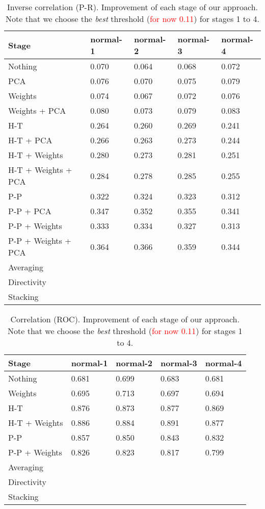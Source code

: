 \documentclass[wcp]{jmlr}
\begin{document}
\begin{table}[htb]
\centering
\caption{Inverse correlation (P-R). Improvement of each stage of our approach. Note that we choose the
         \textit{best} threshold (\textcolor{red}{for now 0.11}) for stages 1 to 4.}
\begin{tabular}{*{5}{l}}
\toprule
Stage               & normal-1 & normal-2 & normal-3 & normal-4 \\
\midrule
Nothing             & 0.070 & 0.064 & 0.068 & 0.072\\
PCA                 & 0.076 & 0.070 & 0.075 & 0.079\\
Weights             & 0.074 & 0.067 & 0.072 & 0.076\\
Weights + PCA       & 0.080 & 0.073 & 0.079 & 0.083\\
H-T                 & 0.264 & 0.260 & 0.269 & 0.241\\
H-T + PCA           & 0.266 & 0.263 & 0.273 & 0.244\\
H-T + Weights       & 0.280 & 0.273 & 0.281 & 0.251\\
H-T + Weights + PCA & 0.284 & 0.278 & 0.285 & 0.255\\
P-P                 & 0.322 & 0.324 & 0.323 & 0.312\\
P-P + PCA           & 0.347 & 0.352 & 0.355 & 0.341\\
P-P + Weights       & 0.333 & 0.334 & 0.327 & 0.313\\
P-P + Weights + PCA & 0.364 & 0.366 & 0.359 & 0.344\\
Averaging           & & & & \\
Directivity         & & & & \\
Stacking            & & & & \\
\bottomrule
\end{tabular}
\end{table}


\begin{table}[htb]
\centering
\caption{Correlation (ROC). Improvement of each stage of our approach. Note that we choose the
         \textit{best} threshold (\textcolor{red}{for now 0.11}) for stages 1 to 4.}
\begin{tabular}{*{5}{l}}
\toprule
Stage               & normal-1 & normal-2 & normal-3 & normal-4 \\
\midrule
Nothing             & 0.681 & 0.699 & 0.683 & 0.681\\
Weights             & 0.695 & 0.713 & 0.697 & 0.694\\
H-T                 & 0.876 & 0.873 & 0.877 & 0.869\\
H-T + Weights       & 0.886 & 0.884 & 0.891 & 0.877\\
P-P                 & 0.857 & 0.850 & 0.843 & 0.832\\
P-P + Weights       & 0.826 & 0.823 & 0.817 & 0.799\\
Averaging           & & & & \\
Directivity         & & & & \\
Stacking            & & & & \\
\bottomrule
\end{tabular}
\end{table}
\end{document}

